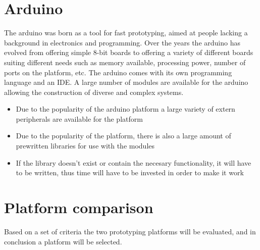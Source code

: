 \section{Arduino}
The arduino was born as a tool for fast prototyping, aimed at people lacking a background in electronics and programming.
Over the years the arduino has evolved from offering simple 8-bit boards to offering a variety of different boards suiting
different needs such as memory available, processing power, number of ports on the platform, etc. The arduino comes with its own programming language and an IDE. A large number of modules are available for the arduino allowing the construction of diverse and complex systems.\Source

\begin{itemize}
	\item Due to the popularity of the arduino platform a large variety of extern peripherals are available for the platform
	\item Due to the popularity of the platform, there is also a large amount of prewritten libraries for use with the modules
	\item If the library doesn't exist or contain the necesary functionality, it will have to be written, thus time will have to be invested in order to make it work
\end{itemize}

\section{Platform comparison}
Based on a set of criteria the two prototyping platforms will be evaluated, and in conclusion a platform will be selected.

